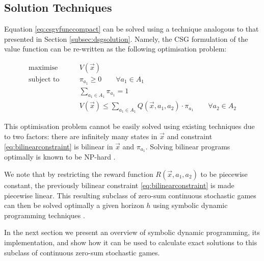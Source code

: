 \subsection{Solution Techniques}

Equation \ref{eq:csgvfunccompact} can be solved using a technique 
analogous to that presented in Section \ref{subsec:dsgsolution}. 
Namely, the CSG formulation of the value function can be re-written 
as the following optimisation problem:

\begin{subequations}
\begin{align}
\text{maximise} & \qquad V(\vec{x}) \\
\text{subject to} & \qquad \pi_{a_1} \geq 0 \qquad \forall a_1 \in A_1 \\
                        & \qquad \sum_{a_1 \in A_1} \pi_{a_1} = 1 \\
                        & \qquad V(\vec{x}) \leq \sum_{a_1 \in A_1} Q(\vec{x}, a_1, a_2) \cdot \pi_{a_1} \qquad \forall a_2 \in A_2 \label{eq:bilinearconstraint}
\end{align}
\end{subequations}

This optimisation problem cannot be easily solved using existing techniques
due to two factors: there are infinitely many states in $\vec{x}$ and
constraint \ref{eq:bilinearconstraint} is bilinear in $\vec{x}$ and 
$\pi_{a_1}$. Solving bilinear programs optimally is known to be
NP-hard \cite{Bennett_COA_1993, Petrik_JoMLR_2011}.

We note that by restricting the reward function $ R(\vec{x}, a_1, a_2) $ 
to be piecewise constant, the previously bilinear constraint \ref{eq:bilinearconstraint}
is made piecewise linear. This resulting subclass of zero-sum continuous stochastic
games can then be solved optimally a given horizon $h$ using symbolic 
dynamic programming techniques \cite{Zamani_AAAI_2012}.


In the next section we present an overview of symbolic dynamic 
programming, its implementation, and show how it can be used to 
calculate exact solutions to this subclass of continuous zero-sum 
stochastic games.